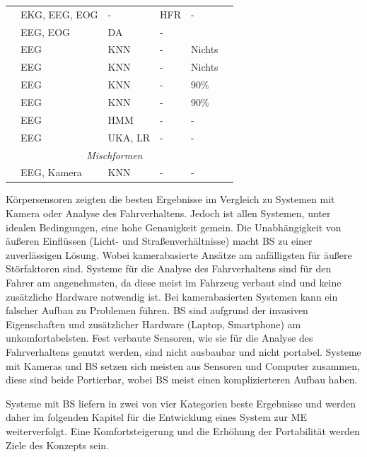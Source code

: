 {\begin{table}[t]
\begin{tabular}{clllll}
	 \cite{Khushaba_5580017} & EKG, EEG, EOG & - & HFR & - \\
	 \cite{Johnson11} & EEG, EOG & DA & - &  \\

	 \cite{wilson_890161} & EEG & KNN & - & Nichts \\
	 \cite{khalifa_893852} & EEG & KNN & - & Nichts \\
	 \cite{Subasi:2005:ARA:1707423.1707550} & EEG & KNN & - & 90\% \\
	 \cite{Vuckovic2002349} & EEG & KNN & - & 90\% \\
	 \cite{Huang_548971} & EEG & HMM & - & - \\
	 \cite{Lin05eeg-baseddrowsiness} & EEG & UKA, LR & - & - \\
     \hline
	 \multicolumn{5}{c}{\textit{Mischformen}} \\
	 \cite{Murthy_1} & EEG, Kamera & KNN & - & - \\

	 \hline
   \end{tabular}
  \label{tab:meinetabelle}
\end{table}

Körpersensoren zeigten die besten Ergebnisse im Vergleich zu Systemen mit Kamera oder Analyse des Fahrverhaltens. Jedoch ist allen Systemen, unter idealen Bedingungen, eine hohe Genauigkeit gemein.
Die Unabhängigkeit von äußeren Einflüssen (Licht- und Straßenverhältnisse) macht \acl{BS} zu einer zuverlässigen Lösung. Wobei kamerabasierte Ansätze am anfälligsten für äußere Störfaktoren sind. 
Systeme für die Analyse des Fahrverhaltens sind für den Fahrer am angenehmsten, da diese meist im Fahrzeug verbaut sind und keine zusätzliche Hardware notwendig ist. Bei kamerabasierten Systemen kann ein falscher Aufbau zu Problemen führen. \acl{BS} sind aufgrund der invasiven Eigenschaften und zusätzlicher Hardware (Laptop, Smartphone) am unkomfortabelsten. 
Fest verbaute Sensoren, wie sie für die Analyse des Fahrverhaltens genutzt werden, sind nicht ausbaubar und nicht portabel. Systeme mit Kameras und \acl{BS} setzen sich meisten aus Sensoren und Computer zusammen, diese sind beide Portierbar, wobei \acl{BS} meist einen komplizierteren Aufbau haben.

Systeme mit \acl{BS} liefern in zwei von vier Kategorien beste Ergebnisse und werden daher im folgenden Kapitel für die Entwicklung eines System zur \acl{ME} weiterverfolgt. Eine Komfortsteigerung und die Erhöhung der Portabilität werden Ziele des Konzepts sein.

}
